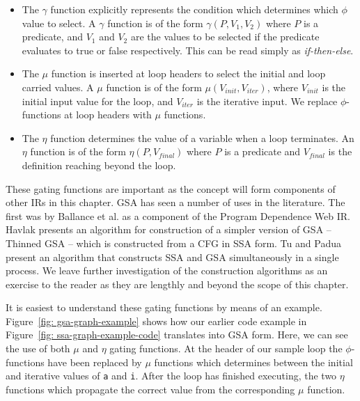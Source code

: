 \begin{itemize}
\item The $\gamma$ function explicitly represents the condition which determines which $\phi$ value to select. A $\gamma$ function is of the form $\gamma(P,V_{1},V_{2})$ where $P$ is a predicate, and $V_{1}$ and $V_{2}$ are the values to be selected if the predicate evaluates to true or false respectively. This can be read simply as \textit{if-then-else}. 
\item The $\mu$ function is inserted at loop headers to select the initial and loop carried values. A $\mu$ function is of the form $\mu(V_{init},V_{iter})$, where $V_{init}$ is the initial input value for the loop, and $V_{iter}$ is the iterative input. We replace $\phi$-functions at loop headers with $\mu$ functions.
\item The $\eta$ function determines the value of a variable when a loop terminates. An $\eta$ function is of the form $\eta(P,V_{final})$ where $P$ is a predicate and $V_{final}$ is the definition reaching beyond the loop.
\end{itemize}

These gating functions are important as the concept will form components of other IRs in this chapter. GSA has seen a number of uses in the literature. The first was by Ballance et al. \cite{93578} as a component of the Program Dependence Web IR. Havlak \cite{Havlak93constructionof} presents an algorithm for construction of a simpler version of GSA -- Thinned GSA -- which is constructed from a CFG in SSA form. Tu and Padua \cite{207115} present an algorithm that constructs SSA and GSA simultaneously in a single process. We leave further investigation of the construction algorithms as an exercise to the reader as they are lengthly and beyond the scope of this chapter. 

It is easiest to understand these gating functions by means of an example. Figure~\ref{fig: gsa-graph-example} shows how our earlier code example in Figure~\ref{fig: ssa-graph-example-code} translates into GSA form. Here, we can see the use of both $\mu$ and $\eta$ gating functions. At the header of our sample loop the $\phi$-functions have been replaced by $\mu$ functions which determines between the initial and iterative values of \texttt{a} and \texttt{i}. After the loop has finished executing, the two $\eta$ functions which propagate the correct value from the corresponding $\mu$ function.

